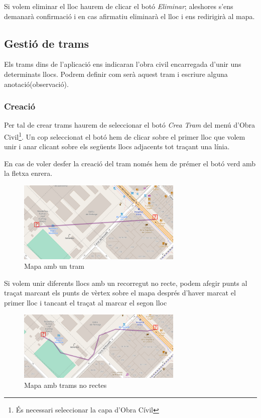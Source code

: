 \documentclass[a4paper]{article}
\begin{document}
	Si volem eliminar el lloc haurem de clicar el botó \emph{Eliminar}; aleshores s'ens demanarà confirmació i en cas afirmatiu eliminarà el lloc i ens redirigirà al mapa.
	
	\subsection{Gestió de trams}
	Els trams dins de l'aplicació ens indicaran l'obra civil encarregada d'unir uns determinats llocs. Podrem definir com serà aquest tram i escriure alguna anotació(observació).
	
	\subsubsection{Creació}
	Per tal de crear trams haurem de seleccionar el botó \emph{Crea Tram} del menú d'Obra Civil\footnote{És necessari seleccionar la capa d'Obra Cívil}. Un cop seleccionat el botó hem de clicar sobre el primer lloc que volem unir i anar clicant sobre els següents llocs adjacents tot traçant una línia.
	
	En cas de voler desfer la creació del tram només hem de prémer el botó verd amb la fletxa enrera.
	
	
	\begin{figure}[H]
		\centering
		\includegraphics[width=0.7\textwidth]{images/path_map_straight.png}
		\caption{Mapa amb un tram}
	\end{figure}
	
	Si volem unir diferents llocs amb un recorregut no recte, podem afegir punts al traçat marcant els punts de vèrtex sobre el mapa després d'haver marcat el primer lloc i tancant el traçat al marcar el segon lloc
	
	\begin{figure}[H]
		\centering
		\includegraphics[width=0.7\textwidth]{images/path_map_curve.png}
		\caption{Mapa amb trams no rectes}
	\end{figure}
\end{document}
